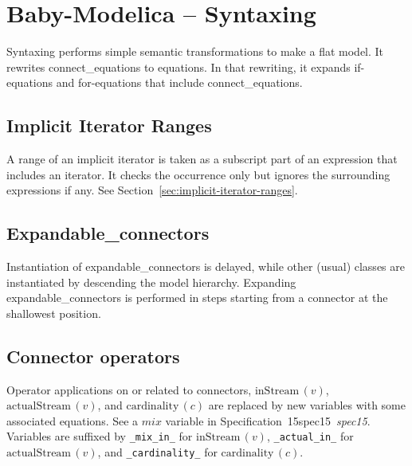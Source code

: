 \documentclass[10pt,b5paper]{article}
\def\specrefx#1#2{Specification~#1\ifx\relax#2\relax{}\else~{\it{}#2}\fi}
\def\specref#1{\specrefx{#1}{\csname spec#1\endcsname}}
\begin{document}

\section{Baby-Modelica -- Syntaxing}

{Syntaxing} performs simple semantic transformations to make a flat
model.  It rewrites connect_equations to equations.  In that
rewriting, it expands if-equations and for-equations that include
connect_equations.


\subsection{Implicit Iterator Ranges}

A range of an implicit iterator is taken as a subscript part of an
expression that includes an iterator.  It checks the occurrence only
but ignores the surrounding expressions if any.  See
Section~\ref{sec:implicit-iterator-ranges}.


\subsection{Expandable_connectors}

Instantiation of expandable_connectors is delayed, while other (usual)
classes are instantiated by descending the model hierarchy.  Expanding
expandable_connectors is performed in steps starting from a connector
at the shallowest position.


\subsection{Connector operators}

Operator applications on or related to connectors,
$\mathrm{inStream}\,(v)$, $\mathrm{actualStream}\,(v)$, and
$\mathrm{cardinality}\,(c)$ are replaced by new variables with some
associated equations.  See a $\mathit{mix}$ variable in \specref{15}.
Variables are suffixed by \verb|_mix_in_| for
$\mathrm{inStream}\,(v)$, \verb|_actual_in_| for
$\mathrm{actualStream}\,(v)$, and \verb|_cardinality_| for
$\mathrm{cardinality}\,(c)$.

\end{document}
